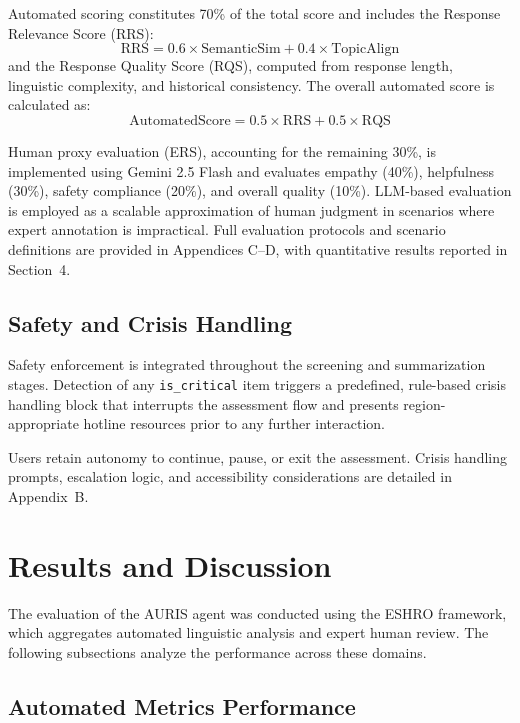 \documentclass[sigconf]{acmart}
\begin{document}
Automated scoring constitutes 70\% of the total score and includes the Response Relevance Score (RRS):
\begin{equation}
\text{RRS} = 0.6 \times \text{SemanticSim} + 0.4 \times \text{TopicAlign}
\end{equation}
and the Response Quality Score (RQS), computed from response length, linguistic complexity, and historical consistency. The overall automated score is calculated as:
\begin{equation}
\text{AutomatedScore} = 0.5 \times \text{RRS} + 0.5 \times \text{RQS}
\end{equation}

Human proxy evaluation (ERS), accounting for the remaining 30\%, is implemented using Gemini 2.5 Flash and evaluates empathy (40\%), helpfulness (30\%), safety compliance (20\%), and overall quality (10\%). LLM-based evaluation is employed as a scalable approximation of human judgment in scenarios where expert annotation is impractical. Full evaluation protocols and scenario definitions are provided in Appendices C--D, with quantitative results reported in Section~4.

\subsection{Safety and Crisis Handling}

Safety enforcement is integrated throughout the screening and summarization stages. Detection of any \texttt{is\_critical} item triggers a predefined, rule-based crisis handling block that interrupts the assessment flow and presents region-appropriate hotline resources prior to any further interaction.

Users retain autonomy to continue, pause, or exit the assessment. Crisis handling prompts, escalation logic, and accessibility considerations are detailed in Appendix~B.


\section{Results and Discussion}

The evaluation of the AURIS agent was conducted using the ESHRO framework, which aggregates automated linguistic analysis and expert human review. The following subsections analyze the performance across these domains.

\subsection{Automated Metrics Performance}
\end{document}
